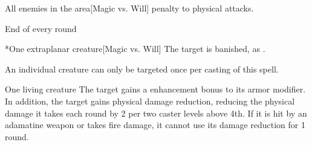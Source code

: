 \begin{comment}
\subsubsection{B}
\end{comment}

\begin{spelltargets}{All enemies in the area}[Magic vs. Will]
    \spellsuccess {} penalty to physical attacks.
\end{spelltargets}

\spellrng{\rngmed}
\spellline
\begin{spelltrigger}{End of every round}
    \begin{spelltarget}*{One extraplanar creature}[Magic vs. Will]
        \spellsuccess The target is banished, as .
    \end{spelltarget}
\end{spelltrigger}
\spelleffect An individual creature can only be targeted once per casting of this spell.

\spelldur{\durshort}
\begin{spelltarget}{One living creature}
    \spelleffect The target gains a  enhancement bonus to its armor modifier. \spellbonusscalingdescription In addition, the target gains physical damage reduction, reducing the physical damage it takes each round by 2  per two caster levels above 4th. If it is hit by an adamatine weapon or takes fire damage, it cannot use its damage reduction for 1 round.
\end{spelltarget}

